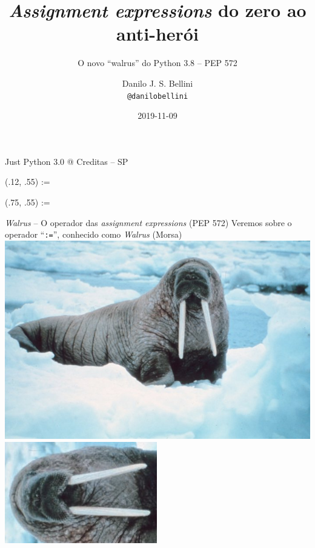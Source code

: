 \documentclass[utf8]{beamer}
\title{\emph{Assignment expressions} do zero ao anti-herói}
\subtitle{O novo ``walrus'' do Python 3.8 -- PEP 572}
\author{Danilo J. S. Bellini \\ \texttt{@danilobellini}}
\date{2019-11-09}
\begin{document}
\begin{frame}
  \titlepage
  \center
  {\huge Just Python 3.0 @ Creditas -- SP}

  \begin{textblock}{0}(.12, .55)%
    \fontsize{5cm}{5cm}\selectfont :=%
  \end{textblock}
  \begin{textblock}{0}(.75, .55)%
    \fontsize{5cm}{5cm}\selectfont :=%
  \end{textblock}
\end{frame}


\begin{frame}{\emph{Walrus} --
              O operador das \emph{assignment expressions} (PEP 572)}
  \centering
  Veremos sobre o operador ``\texttt{:=}'',
  conhecido como \emph{Walrus} (Morsa)
  \vfill
  \includegraphics[width=.6\paperwidth]{Noaa-walrus30.jpg}
  \vfill
  \includegraphics[width=.25\paperwidth]{rotwalrus.jpg}
  \hfill
\end{frame}
\end{document}
